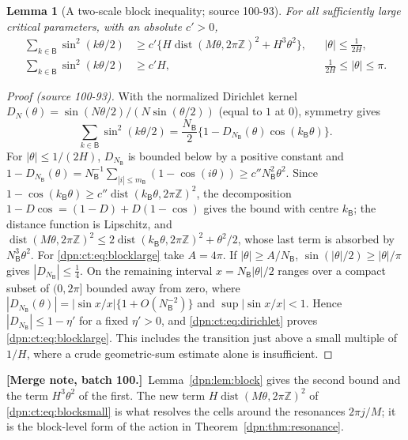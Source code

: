 \documentclass[11pt]{article}
\numberwithin{equation}{section}
\newtheorem{lemma}[theorem]{Lemma}
\theoremstyle{definition}\newtheorem{definition}[theorem]{Definition}
\theoremstyle{remark}\newtheorem{remark}[theorem]{Remark}
\newcommand{\src}[1]{\textup{(source #1)}}
\newcommand{\mergenoted}[1]{\par\smallskip\noindent\textbf{[Merge note, batch 100.]}\ #1\par\smallskip}
\begin{document}
\begin{lemma}[A two-scale block inequality; source 100-93]\label{dpn:ct:lem:block}
For all sufficiently large critical parameters, with an absolute $c'>0$,
\begin{align}
 \sum_{k\in\mathsf B}\sin^2(k\theta/2)
 &\ge c'\bigl\{H\operatorname{dist}(M\theta,2\pi\mathbb Z)^2+H^3\theta^2\bigr\},
 &&|\theta|\le\frac1{2H},\label{dpn:ct:eq:blocksmall}\\
 \sum_{k\in\mathsf B}\sin^2(k\theta/2)&\ge c'H,
 &&\frac1{2H}\le|\theta|\le\pi.\label{dpn:ct:eq:blocklarge}
\end{align}
\end{lemma}
\begin{proof}[Proof \src{100-93}]
With the normalized Dirichlet kernel
$D_N(\theta)=\sin(N\theta/2)/(N\sin(\theta/2))$ (equal to $1$ at $0$),
symmetry gives
\begin{equation}\label{dpn:ct:eq:dirichlet}
 \sum_{k\in\mathsf B}\sin^2(k\theta/2)
 =\frac{N_{\mathsf B}}2\bigl\{1-D_{N_{\mathsf B}}(\theta)\cos(k_{\mathsf B}\theta)\bigr\}.
\end{equation}
For $|\theta|\le1/(2H)$, $D_{N_{\mathsf B}}$ is bounded below by a positive
constant and $1-D_{N_{\mathsf B}}(\theta)=N_{\mathsf B}^{-1}\sum_{|i|\le m_{\mathsf B}}
(1-\cos(i\theta))\ge c''N_{\mathsf B}^2\theta^2$.  Since
$1-\cos(k_{\mathsf B}\theta)\ge c''\operatorname{dist}(k_{\mathsf B}\theta,2\pi\mathbb Z)^2$,
the decomposition $1-D\cos=(1-D)+D(1-\cos)$ gives the bound with centre
$k_{\mathsf B}$; the distance function is Lipschitz, and
$\operatorname{dist}(M\theta,2\pi\mathbb Z)^2\le2\operatorname{dist}(k_{\mathsf B}\theta,2\pi\mathbb Z)^2+\theta^2/2$,
whose last term is absorbed by $N_{\mathsf B}^3\theta^2$.  For
\eqref{dpn:ct:eq:blocklarge} take $A=4\pi$.  If $|\theta|\ge A/N_{\mathsf B}$,
$\sin(|\theta|/2)\ge|\theta|/\pi$ gives $|D_{N_{\mathsf B}}|\le\frac14$.  On the
remaining interval $x=N_{\mathsf B}|\theta|/2$ ranges over a compact subset of
$(0,2\pi]$ bounded away from zero, where
$|D_{N_{\mathsf B}}(\theta)|=|\sin x/x|\{1+O(N_{\mathsf B}^{-2})\}$ and
$\sup|\sin x/x|<1$.  Hence $|D_{N_{\mathsf B}}|\le1-\eta'$ for a fixed
$\eta'>0$, and \eqref{dpn:ct:eq:dirichlet} proves \eqref{dpn:ct:eq:blocklarge}.
This includes the transition just above a small multiple of $1/H$, where a
crude geometric-sum estimate alone is insufficient.
\end{proof}
\mergenoted{Lemma~\ref{dpn:lem:block} gives the second bound and the
term $H^3\theta^2$ of the first.  The new term $H\operatorname{dist}(M\theta,
2\pi\mathbb Z)^2$ of \eqref{dpn:ct:eq:blocksmall} is what resolves the cells
around the resonances $2\pi j/M$; it is the block-level form of the action
in Theorem~\ref{dpn:thm:resonance}.}
\end{document}
